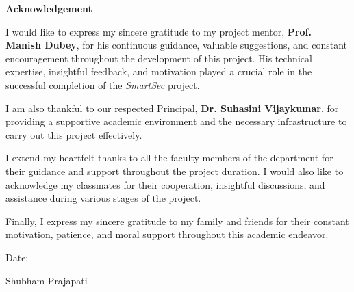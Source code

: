 \newpage
\thispagestyle{empty}

\begin{center}
\textbf{\LARGE{Acknowledgement}}
\end{center}

\vspace{3cm}

{
I would like to express my sincere gratitude to my project mentor,
\textbf{Prof. Manish Dubey}, for his continuous guidance, valuable suggestions,
and constant encouragement throughout the development of this project.
His technical expertise, insightful feedback, and motivation played a crucial
role in the successful completion of the \textit{SmartSec} project.

I am also thankful to our respected Principal, \textbf{Dr. Suhasini Vijaykumar},
for providing a supportive academic environment and the necessary infrastructure
to carry out this project effectively.

I extend my heartfelt thanks to all the faculty members of the department for
their guidance and support throughout the project duration. I would also like
to acknowledge my classmates for their cooperation, insightful discussions, and
assistance during various stages of the project.

Finally, I express my sincere gratitude to my family and friends for their
constant motivation, patience, and moral support throughout this academic endeavor.

}

\vspace{1in}

\begin{flushleft}
Date:
\end{flushleft}

\begin{flushright}
\begin{large}
Shubham Prajapati \\
\end{large}
\end{flushright}
